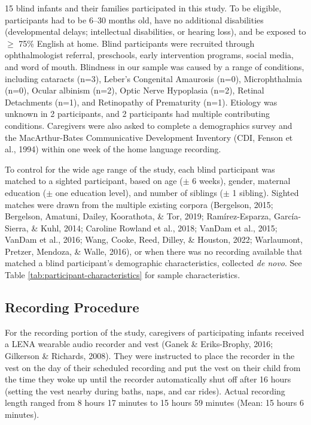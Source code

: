 \documentclass[
  man]{apa6}
\begin{document}
15 blind infants and their families participated in this study. To be eligible, participants had to be 6--30 months old, have no additional disabilities (developmental delays; intellectual disabilities, or hearing loss), and be exposed to \(\geq\) 75\% English at home. Blind participants were recruited through ophthalmologist referral, preschools, early intervention programs, social media, and word of mouth. Blindness in our sample was caused by a range of conditions, including cataracts (n=3), Leber's Congenital Amaurosis (n=0), Microphthalmia (n=0), Ocular albinism (n=2), Optic Nerve Hypoplasia (n=2), Retinal Detachments (n=1), and Retinopathy of Prematurity (n=1). Etiology was unknown in 2 participants, and 2 participants had multiple contributing conditions. Caregivers were also asked to complete a demographics survey and the MacArthur-Bates Communicative Development Inventory (CDI, Fenson et al., 1994) within one week of the home language recording.

To control for the wide age range of the study, each blind participant was matched to a sighted participant, based on age (\(\pm\) 6 weeks), gender, maternal education (\(\pm\) one education level), and number of siblings (\(\pm\) 1 sibling). Sighted matches were drawn from the multiple existing corpora (Bergelson, 2015; Bergelson, Amatuni, Dailey, Koorathota, \& Tor, 2019; Ramírez-Esparza, García-Sierra, \& Kuhl, 2014; Caroline Rowland et al., 2018; VanDam et al., 2015; VanDam et al., 2016; Wang, Cooke, Reed, Dilley, \& Houston, 2022; Warlaumont, Pretzer, Mendoza, \& Walle, 2016), or when there was no recording available that matched a blind participant's demographic characteristics, collected \emph{de novo}. See Table \ref{tab:participant-characteristics} for sample characteristics.

\hypertarget{recording-procedure}{%
\subsection{Recording Procedure}\label{recording-procedure}}

For the recording portion of the study, caregivers of participating infants received a LENA wearable audio recorder and vest (Ganek \& Eriks-Brophy, 2016; Gilkerson \& Richards, 2008). They were instructed to place the recorder in the vest on the day of their scheduled recording and put the vest on their child from the time they woke up until the recorder automatically shut off after 16 hours (setting the vest nearby during baths, naps, and car rides). Actual recording length ranged from 8 hours 17 minutes to 15 hours 59 minutes (Mean: 15 hours 6 minutes).
\end{document}
